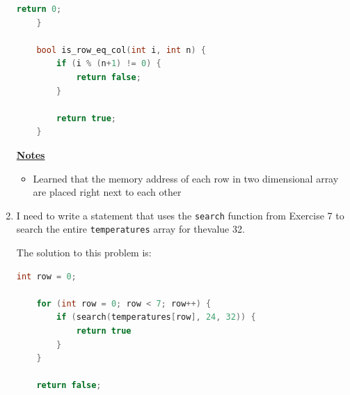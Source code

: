 \documentclass[12pt]{article}
\begin{document}
\begin{enumerate}[1.]
\begin{lstlisting}[language=c]
        return 0;
    }

    bool is_row_eq_col(int i, int n) {
        if (i % (n+1) != 0) {
            return false;
        }

        return true;
    }
\end{lstlisting}

    \bigskip

    \underline{\textbf{Notes}}

    \begin{itemize}
        \item Learned that the memory address of each row in two dimensional array are placed
        right next to each other
    \end{itemize}


    \item

    I need to write a statement that uses the \texttt{search} function from Exercise 7
    to search the entire \texttt{temperatures} array for thevalue 32.

    \bigskip

    The solution to this problem is:

    \bigskip

\begin{lstlisting}[language=c]
    int row = 0;

    for (int row = 0; row < 7; row++) {
        if (search(temperatures[row], 24, 32)) {
            return true
        }
    }

    return false;

\end{lstlisting}



\end{enumerate}
\end{document}
